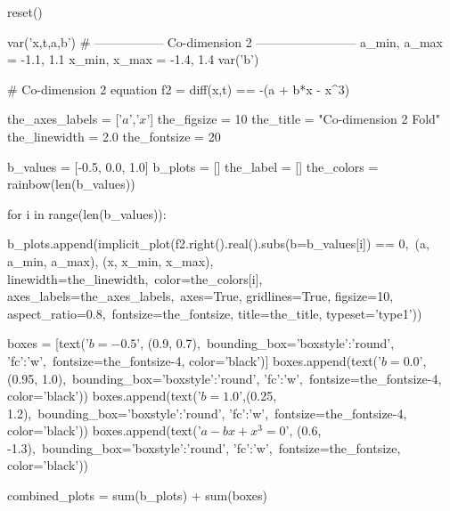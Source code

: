 \documentclass[10pt]{beamer}
\begin{document}

\begin{sagesilent}
	reset()

	var('x,t,a,b')
	# ----------------- Co-dimension 2 ------------------------
	a_min, a_max = -1.1, 1.1
	x_min, x_max = -1.4, 1.4
	var('b')

	# Co-dimension 2 equation
	f2 = diff(x,t) == -(a + b*x - x^3)

	the_axes_labels = ['$a$','$x$']
	the_figsize = 10
	the_title = "Co-dimension 2 Fold"
	the_linewidth = 2.0
	the_fontsize = 20

	b_values = [-0.5, 0.0, 1.0]
	b_plots = []
	the_label = []
	the_colors = rainbow(len(b_values))

	for i in range(len(b_values)):

	    b_plots.append(implicit_plot(f2.right().real().subs(b=b_values[i]) == 0,\
	    		(a, a_min, a_max), (x, x_min, x_max), linewidth=the_linewidth,\
	    		color=the_colors[i], axes_labels=the_axes_labels,\
	    		axes=True, gridlines=True, figsize=10, aspect_ratio=0.8,\
	    		fontsize=the_fontsize, title=the_title, typeset='type1'))

	boxes = [text('$b = -0.5$', (0.9, 0.7),\
			bounding_box={'boxstyle':'round', 'fc':'w'},\
			fontsize=the_fontsize-4, color='black')]
	boxes.append(text('$b = 0.0$', (0.95, 1.0),\
			bounding_box={'boxstyle':'round', 'fc':'w'},\
			fontsize=the_fontsize-4, color='black'))
	boxes.append(text('$b = 1.0$',(0.25, 1.2),\
			bounding_box={'boxstyle':'round', 'fc':'w'},\
			fontsize=the_fontsize-4, color='black'))
	boxes.append(text('$a - bx + x^3 = 0$', (0.6, -1.3),\
			bounding_box={'boxstyle':'round', 'fc':'w'},\
			fontsize=the_fontsize, color='black'))

	combined_plots = sum(b_plots) + sum(boxes)
\end{sagesilent}
\end{document}
